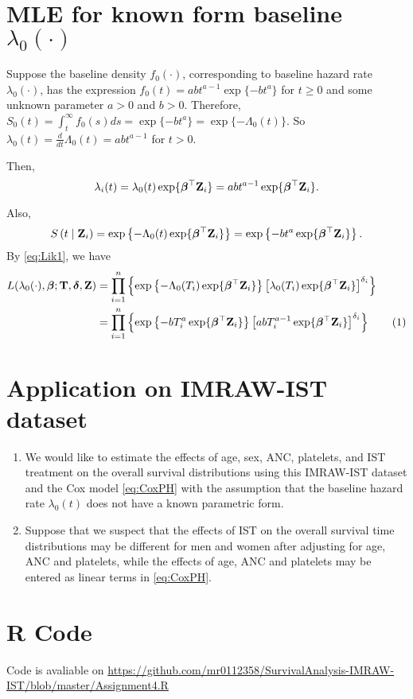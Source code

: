 \documentclass[11pt]{article}
\newcommand{\numit}{\stepcounter{equation}\tag{\theequation}}
\newcommand{\cS}[1]{S \left( #1 \mid \bZ_i \right)}
\newcommand{\bT}{{\bf{T}}}
\newcommand{\bZ}{{\bf{Z}}}
\newcommand{\bdelta}{{\bm \delta}}
\newcommand{\bbeta}{{\bm \beta}}
\begin{document}
\section{MLE for known form baseline $\lambda_{0}(\cdot)$}
Suppose the baseline density $f_0(\cdot)$, corresponding to baseline hazard rate
$\lambda_0(\cdot)$, has the expression $f_0(t)=abt^{a-1}\exp \{-bt^a\}$ for
$t\geq 0$ and some unknown parameter $a>0$ and $b>0$.
Therefore, $S_0(t) = \int_t^{\infty}f_0(s)ds = \exp\{-bt^a\} = \exp\{-\Lambda_0(t)\}$.
So $\lambda_0(t) = \frac{d}{dt}\Lambda_0(t)= abt^{a-1}$ for $t>0$.

Then,
\begin{equation}
\label{eq:lam2}
\lambda_i(t) = \lambda_0(t)\exp\{\bbeta^{\top}\bZ_i\} = abt^{a-1}\exp\{\bbeta^{\top}\bZ_i\}.
\end{equation}

Also,
\begin{equation}
\label{eq:S2}
\cS{t} = \exp \left\{ -\Lambda_0(t) \exp\{\bbeta^{\top}\bZ_i\} \right\} = \exp \left\{ -bt^a \exp\{\bbeta^{\top}\bZ_i\} \right\}.
\end{equation}
By \eqref{eq:Lik1}, we have
\begin{align*}
L(\lambda_0(\cdot),\bbeta;\bT,\bdelta,\bZ) &= \prod_{i=1}^n \left\{\exp \left\{ -\Lambda_0(T_i) \exp\{\bbeta^{\top}\bZ_i\} \right\} \left[ \lambda_0(T_i)\exp\{\bbeta^{\top}\bZ_i\} \right]^{\delta_i} \right\}\\
  &= \prod_{i=1}^n \left\{\exp \left\{ -bT_i^a \exp\{\bbeta^{\top}\bZ_i\} \right\} \left[ abT_i^{a-1}\exp\{\bbeta^{\top}\bZ_i\} \right]^{\delta_i} \right\}
  \numit\label{eq:Lik2}
\end{align*}
\section{Application on IMRAW-IST dataset}
\begin{enumerate}
\item We would like to estimate the effects of age, sex, ANC, platelets, and IST
treatment on the overall survival distributions using this IMRAW-IST dataset and
the Cox model \eqref{eq:CoxPH} with the assumption that the baseline hazard rate
$\lambda_0(t)$ does not have a known parametric form.

\item Suppose that we suspect that the effects of IST on the overall survival
  time distributions may be different for men and women after adjusting for age,
  ANC and platelets, while the effects of age, ANC and platelets may be entered
  as linear terms in \eqref{eq:CoxPH}.

  
\end{enumerate}


\appendix

\section{R Code}

Code is avaliable on \url{https://github.com/mr0112358/SurvivalAnalysis-IMRAW-IST/blob/master/Assignment4.R}

\begin{lstlisting}

\end{lstlisting}
\end{document}
